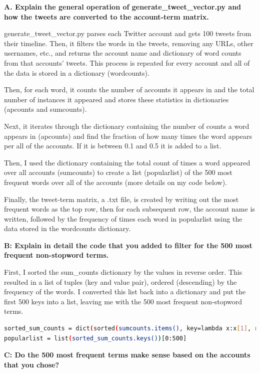 \documentclass[12pt]{article}
\begin{document}
\noindent \textbf{A. Explain the general operation of generate\_tweet\_vector.py and how the tweets are converted to the account-term matrix.}

generate\_tweet\_vector.py parses each Twitter account and gets 100 tweets from their timeline. Then, it filters the words in the tweets, removing any URLs, other usernames, etc., and returns the account name and dictionary of word counts from that accounts' tweets. This process is repeated for every account and all of the data is stored in a dictionary (wordcounts).

Then, for each word, it counts the number of accounts it appears in and the total number of instances it appeared and stores these statistics in dictionaries (apcounts and sumcounts). 

Next, it iterates through the dictionary containing the number of counts a word appears in (apcounts) and find the fraction of how many times the word appears per all of the accounts. If it is between 0.1 and 0.5 it is added to a list.

Then, I used the dictionary containing the total count of times a word appeared over all accounts (sumcounts) to create a list (popularlist) of the 500 most frequent words over all of the accounts (more details on my code below). 

Finally, the tweet-term matrix, a .txt file, is created by writing out the most frequent words as the top row, then for each subsequent row, the account name is written, followed by the frequency of times each word in popularlist using the data stored in the wordcounts dictionary. 


\noindent \textbf{B: Explain in detail the code that you added to filter for the 500 most frequent non-stopword terms.}

First, I sorted the sum\_counts dictionary by the values in reverse order. This resulted in a list of tuples (key and value pair), ordered (descending) by the frequency of the words. I converted this list back into a dictionary and put the first 500 keys into a list, leaving me with the 500 most frequent non-stopword terms.

\begin{lstlisting}[language=bash, label=lst:copy]
sorted_sum_counts = dict(sorted(sumcounts.items(), key=lambda x:x[1], reverse=True))
popularlist = list(sorted_sum_counts.keys())[0:500]
\end{lstlisting}

\noindent \textbf{C: Do the 500 most frequent terms make sense based on the accounts that you chose?}
\end{document}
